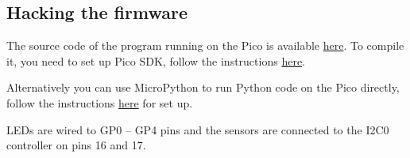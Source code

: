 \documentclass{article}
\begin{document}
\subsection{Hacking the firmware}
The source code of the program running on the Pico is available \href{https://bitbucket.org/emil_varga/picolab/src/master/}{here}. To compile it, you need to set up Pico SDK, follow the instructions \href{https://www.raspberrypi.com/documentation/microcontrollers/c_sdk.html}{here}.

Alternatively you can use MicroPython to run Python code on the Pico directly, follow the instructions \href{https://www.raspberrypi.com/documentation/microcontrollers/micropython.html#what-is-micropython}{here} for set up. 

LEDs are wired to GP0 -- GP4 pins and the sensors are connected to the I2C0 controller on pins 16 and 17.
\end{document}
